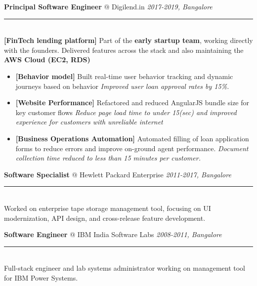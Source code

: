\documentclass[11pt]{article}
\makeatletter
\newcommand{\roleheader}[3]{%
  {\large\sffamily\textbf{#1} @ #2} \hfill \textit{#3}\\[-0.3em]
  \color{myblue}\rule{\linewidth}{1pt}\\[0.5em]\color{bodytext}
}
\newenvironment{experiencebullets}{%
  \begin{itemize}[leftmargin=1.25em, itemsep=-0.25em]
    \renewcommand{\labelitemi}{\textbullet}
}{%
  \end{itemize}
}
\newenvironment{experience}[4]{%
  \roleheader{#1}{#2}{#3}%
  #4\vspace{0.5em}%
}{%
  \vspace{1em}
}
\newcommand{\expbullet}[3]{%
  \item \textbf{[#1]} {#2} \textrightarrow{} \textit{#3}%
}
\makeatother
\begin{document}
\begin{experience}{Principal Software Engineer}{Digilend.in}{2017-2019, Bangalore}
  {\textbf{[FinTech lending platform]} Part of the \textbf{early startup team},
    working directly with the founders. Delivered features across the stack and also maintaining the \textbf{AWS Cloud (EC2, RDS)}
  }
  \begin{experiencebullets}
    \expbullet {Behavior model}{Built real-time user behavior tracking and dynamic journeys based on behavior}{Improved user loan approval rates by 15\%.}
    \expbullet {Website Performance}{Refactored and reduced AngularJS bundle size for key customer flows}{Reduce page load time to under 15(sec) and improved experience for customers with unreliable internet}
    \expbullet {Business Operations Automation}{Automated filling of loan application forms to reduce errors and improve on-ground agent performance.}{Document collection time reduced to less than 15 minutes per customer.}
  \end{experiencebullets}
\end{experience}


\begin{experience}{Software Specialist}{Hewlett Packard Enterprise}{2011-2017, Bangalore}{Worked on enterprise tape storage management tool, focusing on UI modernization, API design, and cross-release feature development.}
\end{experience}

\begin{experience}{Software Engineer}{IBM India Software Labs}{2008-2011, Bangalore}{Full-stack engineer and lab systems administrator working on management tool for IBM Power Systems.}
\end{experience}
\end{document}
